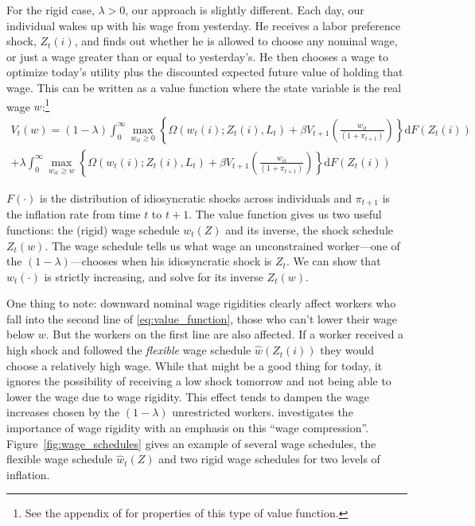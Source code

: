 \documentclass[12pt,a4paper]{scrartcl}            %
\begin{document}
For the rigid case, $\lambda > 0$, our approach is slightly different.
Each day, our individual wakes up with his wage from yesterday.
He receives a labor preference shock, $Z_t(i)$, and finds out whether he is allowed to choose any nominal wage, or just a wage greater than or equal to yesterday's.
He then chooses a wage to optimize today's utility plus the discounted expected future value of holding that wage.
This can be written as a value function where the state variable is the real wage $w$:\footnote{
    See the appendix of \cite{daly_hobijn_2013} for properties of this type of value function.
}
\begin{multline}
    \label{eq:value_function}
    V_t(w) = (1 - \lambda) \int_{0}^{\infty} \max_{w_{it} \geq 0} \left\{ \Omega( w_t(i); Z_t(i), L_t ) + \beta V_{t+1}\left( \frac{w_{it}}{(1 + \pi_{t+1})} \right) \right\} \mathrm{d}F(Z_t(i)) \\
                + \lambda  \int_{0}^{\infty} \max_{w_{it} \geq w} \left\{ \Omega( w_t(i); Z_t(i), L_t ) + \beta V_{t+1}\left( \frac{w_{it}}{(1 + \pi_{t+1})} \right) \right\} \mathrm{d}F(Z_t(i))
\end{multline}

$F(\cdot)$ is the distribution of idiosyncratic shocks across individuals and $\pi_{t+1}$ is the inflation rate from time $t$ to $t+1$.
The value function gives us two useful functions: the (rigid) wage schedule $w_t(Z)$ and its inverse, the shock schedule $Z_t(w)$.
The wage schedule tells us what wage an unconstrained worker---one of the $(1 - \lambda)$---chooses when his idiosyncratic shock is $Z_t$.
We can show that $w_t(\cdot)$ is strictly increasing, and solve for its inverse $Z_t(w)$.

One thing to note: downward nominal wage rigidities clearly affect workers who fall into the second line of \eqref{eq:value_function}, those who can't lower their wage below $w$.
But the workers on the first line are also affected.
If a worker received a high shock and followed the \emph{flexible} wage schedule $\hat{w}(Z_t(i))$ they would choose a relatively high wage.
While that might be a good thing for today, it ignores the possibility of receiving a low shock tomorrow and not being able to lower the wage due to wage rigidity.
This effect tends to dampen the wage increases chosen by the $(1 - \lambda)$ unrestricted workers.
\cite{elsby_2009} investigates the importance of wage rigidity with an emphasis on this ``wage compression''.
Figure~\ref{fig:wage_schedules} gives an example of several wage schedules, the flexible wage schedule $\hat{w}_t(Z)$ and two rigid wage schedules for two levels of inflation.
\end{document}
